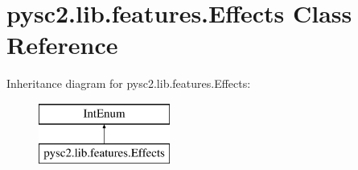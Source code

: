 \hypertarget{classpysc2_1_1lib_1_1features_1_1_effects}{}\section{pysc2.\+lib.\+features.\+Effects Class Reference}
\label{classpysc2_1_1lib_1_1features_1_1_effects}
Inheritance diagram for pysc2.\+lib.\+features.\+Effects\+:\begin{figure}[H]
\begin{center}
\leavevmode
\includegraphics[height=2.000000cm]{classpysc2_1_1lib_1_1features_1_1_effects}
\end{center}
\end{figure}
